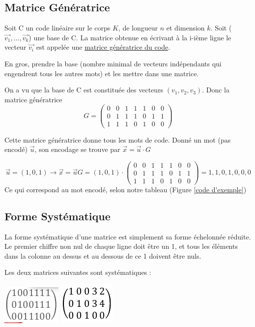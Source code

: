 \documentclass[11pt,a4paper]{article}
\begin{document}
\subsection{Matrice Génératrice}
 Soit C un code linéaire sur le corps $K$, de longueur $n$ et dimension $k$. Soit ($\vec{v_1},\ldots,\vec{v_k}$) une base de C. La matrice obtenue en écrivant à la i-ième ligne le vecteur $\vec{v_i}$ est appelée une \uline{matrice génératrice du code}.

En gros, prendre la base (nombre minimal de vecteurs indépendants qui engendrent tous les autres mots) et les mettre dans une matrice.
\begin{exemple}
	On a vu que la base de C est constituée des vecteurs $(v_1,v_2,v_3)$. Donc la matrice génératrice 
	\[G = 
	\begin{pmatrix}
		0&0&1&1&1&0&0\\
		0&1&1&1&0&1&1\\
		1&1&1&0&1&0&0
	\end{pmatrix}
	\]
\end{exemple}
Cette matrice génératrice donne tous les mots de code. Donné un mot (pas encodé) $\vec{u}$, son encodage se trouve par $\vec{x} = \vec{u}\cdot G$
\begin{exemple}
	\[\vec{u} = (1,0,1) \to \vec{x} = \vec{u}G = (1,0,1)\cdot
	\begin{pmatrix}
		0&0&1&1&1&0&0\\
		0&1&1&1&0&1&1\\
		1&1&1&0&1&0&0
	\end{pmatrix}
	= 1,1,0,1,0,0,0\]
	Ce qui correspond au mot encodé, selon notre tableau (Figure \ref{code d'exemple})
\end{exemple}

\subsection{Forme Systématique}
\label{systematique}
La forme systématique d'une matrice est simplement sa forme échelonnée réduite. Le premier chiffre non nul de chaque ligne doit être un 1, et tous les éléments dans la colonne au dessus et au dessous de ce 1 doivent être nuls.

\begin{exemple}[0.5]
	Les deux matrices suivantes sont systématiques :
	\begin{center}
		\includegraphics[scale=0.6]{images/g1}
		\includegraphics[scale=0.6]{images/g3}
	\end{center}	
\end{exemple}
\end{document}
